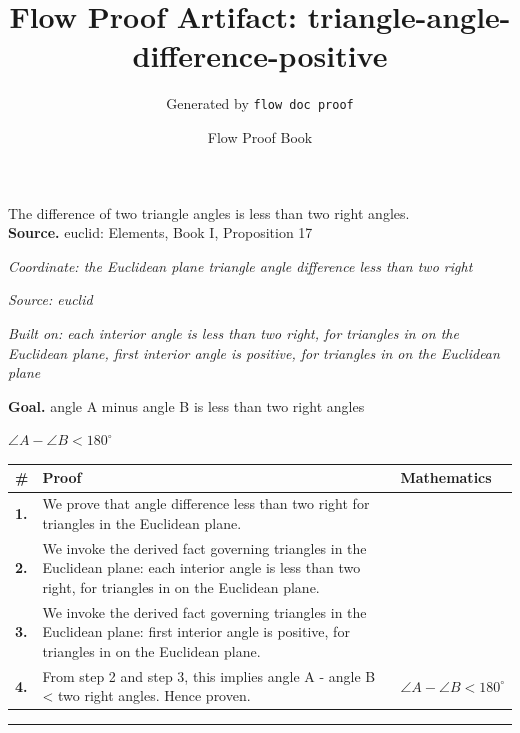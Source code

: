 \documentclass[11pt]{article}
\title{Flow Proof Artifact: triangle-angle-difference-positive}
\author{Generated by \texttt{flow doc proof}}
\date{Flow Proof Book}
\theoremstyle{definition}
\begin{document}
\maketitle
The difference of two triangle angles is less than two right angles.\\[0.5em]
\textbf{Source.} euclid: Elements, Book I, Proposition 17\\[0.5em]
\bigskip
{}\par
\smallskip\noindent\textit{Coordinate: the Euclidean plane \cdot triangle \cdot angle difference less than two right}\par
\smallskip\noindent\textit{Source: euclid}\par
\smallskip\noindent\textit{Built on: each interior angle is less than two right, for triangles in on the Euclidean plane, first interior angle is positive, for triangles in on the Euclidean plane}\par
\medskip
\noindent\textbf{Goal.} angle A minus angle B is less than two right angles\par
\noindent$\displaystyle \angle A - \angle B < 180^\circ$\par
\medskip
\noindent
\begin{tabular}{@{} >{\raggedright\arraybackslash}p{} >{\raggedright\arraybackslash}p{} >{\raggedleft\arraybackslash}p{} @{}}
\textbf{\#} & \textbf{Proof} & \textbf{Mathematics} \\
\midrule
\textbf{1.} & We prove that angle difference less than two right for triangles in the Euclidean plane. & \\[0.45em]
\textbf{2.} & We invoke the derived fact governing triangles in the Euclidean plane: each interior angle is less than two right, for triangles in on the Euclidean plane. & \\[0.45em]
\textbf{3.} & We invoke the derived fact governing triangles in the Euclidean plane: first interior angle is positive, for triangles in on the Euclidean plane. & \\[0.45em]
\textbf{4.} & From step 2 and step 3, this implies angle A - angle B < two right angles. Hence proven. & $\displaystyle \angle A - \angle B < 180^\circ$ \\[0.45em]
\bottomrule
\end{tabular}
\label{thm:Geometry-triangle-angle_difference_less_than_two_right}
\par\medskip\hrule
\end{document}
